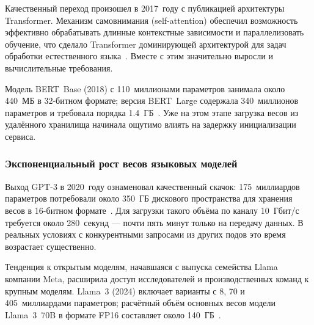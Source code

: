 Качественный переход произошел в 2017~году с публикацией архитектуры Transformer. Механизм самовнимания (self-attention) обеспечил возможность эффективно обрабатывать длинные контекстные зависимости и параллелизовать обучение, что сделало Transformer доминирующей архитектурой для задач обработки естественного языка~\cite{bert2018}. Вместе с этим значительно выросли и вычислительные требования.

Модель BERT~Base (2018) с 110~миллионами параметров занимала около 440~МБ в 32-битном формате; версия BERT~Large содержала 340~миллионов параметров и требовала порядка 1.4~ГБ~\cite{bert2018}. Уже на этом этапе загрузка весов из удалённого хранилища начинала ощутимо влиять на задержку инициализации сервиса.

\subsubsection{Экспоненциальный рост весов языковых моделей}

Выход GPT-3 в 2020~году ознаменовал качественный скачок: 175~миллиардов параметров потребовали около 350~ГБ дискового пространства для хранения весов в 16-битном формате~\cite{gpt3_2020}. Для загрузки такого объёма по каналу 10~Гбит/с требуется около 280~секунд — почти пять минут только на передачу данных. В реальных условиях с конкурентными запросами из других подов это время возрастает существенно.

Тенденция к открытым моделям, начавшаяся с выпуска семейства Llama компании Meta, расширила доступ исследователей и производственных команд к крупным моделям. Llama~3 (2024) включает варианты с 8, 70 и 405~миллиардами параметров; расчётный объём основных весов модели Llama~3~70B в формате FP16 составляет около 140~ГБ~\cite{llamapaper2024}.

